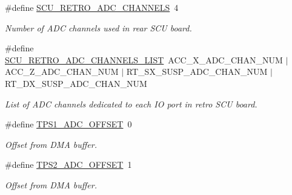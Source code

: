 \begin{DoxyCompactItemize}
\mbox{\label{group___board__model__group_gadedc78ae5ed236e74a4e12c031209d29}} 
\#define \mbox{\hyperlink{group___board__model__group_gadedc78ae5ed236e74a4e12c031209d29}{S\+C\+U\+\_\+\+R\+E\+T\+R\+O\+\_\+\+A\+D\+C\+\_\+\+C\+H\+A\+N\+N\+E\+LS}}~4
\begin{DoxyCompactList}\small\item\em Number of A\+DC channels used in rear S\+CU board. \end{DoxyCompactList}\item 
\mbox{\label{group___board__model__group_ga5190c5da456959fb6c7132518a51f12f}} 
\#define \mbox{\hyperlink{group___board__model__group_ga5190c5da456959fb6c7132518a51f12f}{S\+C\+U\+\_\+\+R\+E\+T\+R\+O\+\_\+\+A\+D\+C\+\_\+\+C\+H\+A\+N\+N\+E\+L\+S\+\_\+\+L\+I\+ST}}~A\+C\+C\+\_\+\+X\+\_\+\+A\+D\+C\+\_\+\+C\+H\+A\+N\+\_\+\+N\+UM $\vert$ A\+C\+C\+\_\+\+Z\+\_\+\+A\+D\+C\+\_\+\+C\+H\+A\+N\+\_\+\+N\+UM $\vert$ R\+T\+\_\+\+S\+X\+\_\+\+S\+U\+S\+P\+\_\+\+A\+D\+C\+\_\+\+C\+H\+A\+N\+\_\+\+N\+UM $\vert$ R\+T\+\_\+\+D\+X\+\_\+\+S\+U\+S\+P\+\_\+\+A\+D\+C\+\_\+\+C\+H\+A\+N\+\_\+\+N\+UM
\begin{DoxyCompactList}\small\item\em List of A\+DC channels dedicated to each IO port in retro S\+CU board. \end{DoxyCompactList}\item 
\mbox{\label{group___board__model__group_ga7ce02d79fba23321a377a26a963e2bdf}} 
\#define \mbox{\hyperlink{group___board__model__group_ga7ce02d79fba23321a377a26a963e2bdf}{T\+P\+S1\+\_\+\+A\+D\+C\+\_\+\+O\+F\+F\+S\+ET}}~0
\begin{DoxyCompactList}\small\item\em Offset from D\+MA buffer. \end{DoxyCompactList}\item 
\mbox{\label{group___board__model__group_ga24019e59e805c7acf8f816e141d3d689}} 
\#define \mbox{\hyperlink{group___board__model__group_ga24019e59e805c7acf8f816e141d3d689}{T\+P\+S2\+\_\+\+A\+D\+C\+\_\+\+O\+F\+F\+S\+ET}}~1
\begin{DoxyCompactList}\small\item\em Offset from D\+MA buffer. \end{DoxyCompactList}\item 

\end{DoxyCompactItemize}
